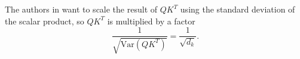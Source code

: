 \documentclass{article}
\theoremstyle{plain}
\theoremstyle{plain} %
\theoremstyle{definition}  %
\theoremstyle{remark}  %
\theoremstyle{plain}
\begin{document}
The authors in \cite{vaswani2017attention} want to scale the result of $QK^T$ using the standard deviation of the scalar product, so $QK^T$ is multiplied by a factor 
$$\frac{1}{\sqrt{\text{Var}\left(QK^T \right)}}=\frac{1}{\sqrt{d_k}}.$$



\end{document}
